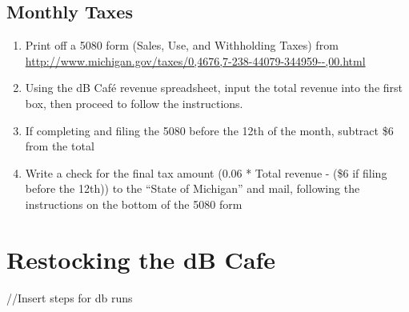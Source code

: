 \documentclass[12pt,onecolumn,letterpaper]{article}
\begin{document}
\subsection{Monthly Taxes}
\begin{enumerate}
\item Print off a 5080 form (Sales, Use, and Withholding Taxes) from \url{http://www.michigan.gov/taxes/0,4676,7-238-44079-344959--,00.html}
\item Using the dB Café revenue spreadsheet, input the total revenue into the first box, then proceed to follow the instructions.
\item If completing and filing the 5080 before the 12th of the month, subtract \$6 from the total
\item Write a check for the final tax amount (0.06 * Total revenue - (\$6 if filing before the 12th)) to the ``State of Michigan'' and mail, following the instructions on the bottom of the 5080 form
\end{enumerate}
\section{Restocking the dB Cafe}
//Insert steps for db runs
\end{document}
